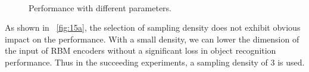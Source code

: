 \documentclass[9pt,twocolumn]{article}
\begin{document}
\begin{figure}
\centering
  \\
\caption{Performance with different parameters.}
\label{fig:15}
\end{figure}

As shown in \figurename~\ref{fig:15a},
the selection of sampling density does not exhibit obvious impact on the performance.
With a small density, we can lower the dimension of the input of RBM encoders
without a significant loss in object recognition performance.
Thus in the succeeding experiments, a sampling density of $3$ is used. 
\end{document}
